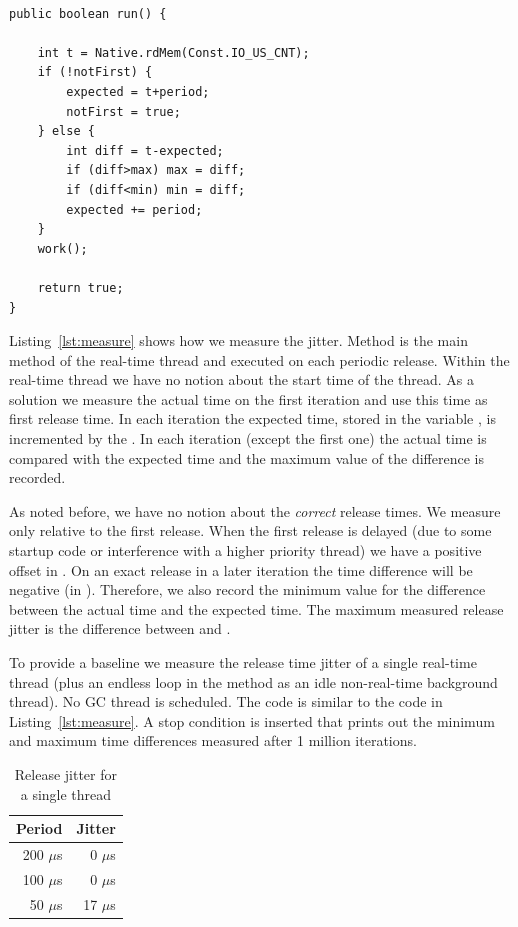 \begin{lstlisting}[float, caption={Measuring release time jitter},
label=lst:measure]

public boolean run() {

    int t = Native.rdMem(Const.IO_US_CNT);
    if (!notFirst) {
        expected = t+period;
        notFirst = true;
    } else {
        int diff = t-expected;
        if (diff>max) max = diff;
        if (diff<min) min = diff;
        expected += period;
    }
    work();

    return true;
}
\end{lstlisting}

Listing~\ref{lst:measure} shows how we measure the jitter. Method
 is the main method of the real-time thread and executed
on each periodic release. Within the real-time thread we have no
notion about the start time of the thread. As a solution we measure
the actual time on the first iteration and use this time as first
release time. In each iteration the expected time, stored in the
variable , is incremented by the . In
each iteration (except the first one) the actual time is compared
with the expected time and the maximum value of the difference is
recorded.

As noted before, we have no notion about the \emph{correct} release
times. We measure only relative to the first release. When the first
release is delayed (due to some startup code or interference with a
higher priority thread) we have a positive offset in
. On an exact release in a later iteration the time
difference will be negative (in ). Therefore, we also
record the minimum value for the difference between the actual time
and the expected time. The maximum measured release jitter is the
difference between  and .

To provide a baseline we measure the release time jitter of a single
real-time thread (plus an endless loop in the  method as
an idle non-real-time background thread). No GC thread is scheduled.
The code is similar to the code in Listing~\ref{lst:measure}. A stop
condition is inserted that prints out the minimum and maximum time
differences measured after 1 million iterations.

\begin{table}
    \centering
    \begin{tabular}{rr}
    \toprule
    Period & Jitter \\
    \midrule
    200 $\mu$s & 0 $\mu$s \\
    100 $\mu$s & 0 $\mu$s \\
    50 $\mu$s & 17 $\mu$s \\
    \bottomrule
    \end{tabular}
    \caption{Release jitter for a single thread}
    \label{tab:single}
\end{table}

